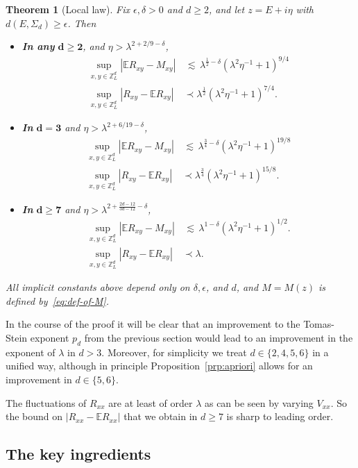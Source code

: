 \documentclass[11pt]{amsart}
\def\bbZ{{\mathbb Z}}
\def\Z{{\mathbb{Z}}}
\def\Expec{{\mathbb E}}
\def\lsim{{\,\lesssim\,}}
\newcommand{\ldom}{\prec}
\numberwithin{equation}{section}
\newtheorem{theorem}{Theorem}
\numberwithin{theorem}{section}
\begin{document}
\begin{theorem}[Local law]
\label{thm:local-law}
Fix $\epsilon,\delta>0$ and $d\geq 2$, and let $z = E+i\eta$ with $d(E,\Sigma_d)\geq \epsilon$.
Then
\begin{itemize}
\item \textbf{In any} $\mathbf{d \geq 2}$,
and $\eta > \lambda^{2+2/9-\delta}$,
\begin{align*}
\sup_{x,y\in \Z^{d}_{L}}|\Expec R_{xy} - M_{xy}| &\lsim
\lambda^{\frac12-\delta} (\lambda^2\eta^{-1}+1)^{9/4} \\
\sup_{x,y\in \bbZ^{d}_{L}}|R_{xy} - \Expec R_{xy}| &\ldom \lambda^{\frac12} (\lambda^2\eta^{-1}+1)^{7/4}.
\end{align*}
\item \textbf{In} $\mathbf{d=3}$ and $\eta > \lambda^{2+6/19-\delta}$,
\begin{align*}
\sup_{x,y\in \Z^{d}_{L}}|\Expec R_{xy} - M_{xy}| &\lsim \lambda^{\frac34-\delta}
(\lambda^2\eta^{-1}+1)^{19/8} \\
\sup_{x,y\in \Z^{d}_{L}}|R_{xy}-\Expec R_{xy}| &\ldom \lambda^{\frac34}
(\lambda^2\eta^{-1}+1)^{15/8}.
\end{align*}
\item \textbf{In} $\mathbf{d\geq 7}$ and $\eta > \lambda^{2+\frac{2d-12}{3d-12} - \delta}$,
\begin{align*}
\sup_{x,y\in \Z^{d}_{L}}|\Expec R_{xy} - M_{xy}| &\lsim \lambda^{1-\delta} (\lambda^2 \eta^{-1}+1)^{1/2}.
\\
\sup_{x,y\in \Z^{d}_{L}}|R_{xy}-\Expec R_{xy}| &\ldom \lambda.
\end{align*}
\end{itemize}
All implicit constants above depend only on $\delta, \epsilon$, and $d$, and $M=M(z)$
is defined by~\eqref{eq:def-of-M}.
\end{theorem}

In the course of the proof it will be clear that an improvement to the Tomas-Stein exponent $p_d$ from the previous section would lead to an improvement in the exponent of $\lambda$ in $d>3$.
Moreover, for simplicity we treat $d\in\{2,4,5,6\}$ in a unified way, although in principle Proposition~\ref{prp:apriori} allows for an improvement in $d\in\{5,6\}$.

The fluctuations of $R_{xx}$ are at least of order $\lambda$ as can be seen by varying $V_{xx}$.
So the bound on $|R_{xx}-\mathbb{E}R_{xx}|$ that we obtain in $d\geq 7$ is sharp to leading order.

\subsection{The key ingredients}
\end{document}
